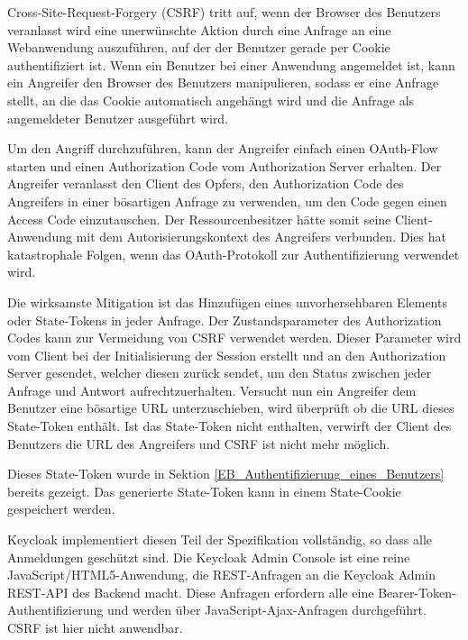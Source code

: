 
Cross-Site-Request-Forgery (CSRF) tritt auf, wenn der Browser des Benutzers veranlasst wird eine unerwünschte Aktion durch eine Anfrage an eine Webanwendung auszuführen, auf der der Benutzer gerade per Cookie authentifiziert ist. Wenn ein Benutzer bei einer Anwendung angemeldet ist, kann ein Angreifer den Browser des Benutzers manipulieren, sodass er eine Anfrage stellt, an die das Cookie automatisch angehängt wird und die Anfrage als angemeldeter Benutzer ausgeführt wird. 

Um den Angriff durchzuführen, kann der Angreifer einfach einen OAuth-Flow starten und einen Authorization Code vom Authorization Server erhalten. Der Angreifer veranlasst den Client des Opfers, den Authorization Code des Angreifers in einer bösartigen Anfrage zu verwenden, um den Code gegen einen Access Code einzutauschen. Der Ressourcenbesitzer hätte somit seine Client-Anwendung mit dem Autorisierungskontext des Angreifers verbunden. Dies hat katastrophale Folgen, wenn das OAuth-Protokoll zur Authentifizierung verwendet wird. \cite{OAuth2inAction}

Die wirksamste Mitigation ist das Hinzufügen eines unvorhersehbaren Elements oder State-Tokens in jeder Anfrage. Der Zustandsparameter des Authorization Codes kann zur Vermeidung von CSRF verwendet werden. Dieser Parameter wird vom Client bei der Initialisierung der Session erstellt und an den Authorization Server gesendet, welcher diesen zurück sendet, um den Status zwischen jeder Anfrage und Antwort aufrechtzuerhalten. Versucht nun ein Angreifer dem Benutzer eine bösartige URL unterzuschieben, wird überprüft ob die URL dieses State-Token enthält. Ist das State-Token nicht enthalten, verwirft der Client des Benutzers die URL des Angreifers und CSRF ist nicht mehr möglich. \cite{OAuth2inAction}

Dieses State-Token wurde in Sektion \ref{EB_Authentifizierung_eines_Benutzers} bereits gezeigt. Das generierte State-Token kann in einem State-Cookie gespeichert werden.

Keycloak implementiert diesen Teil der Spezifikation vollständig, so dass alle Anmeldungen geschützt sind. Die Keycloak Admin Console ist eine reine JavaScript/HTML5-Anwendung, die REST-Anfragen an die Keycloak Admin REST-API des Backend macht. Diese Anfragen erfordern alle eine Bearer-Token-Authentifizierung und werden über JavaScript-Ajax-Anfragen durchgeführt. CSRF ist hier nicht anwendbar. \cite{keycloakDocs}

